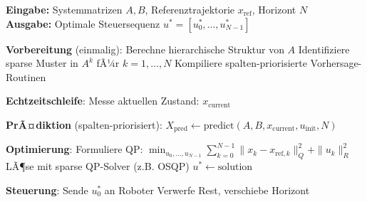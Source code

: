 ﻿\documentclass[a4paper,12pt]{report}
\theoremstyle{definition}
\begin{document}
	\begin{algorithm}[H]
		\caption{Strukturausnutzende MPC fÃ¼r Robotersteuerung}
		\label{alg:robot-mpc}
		\textbf{Eingabe:} Systemmatrizen $A, B$, Referenztrajektorie $x_{\text{ref}}$, Horizont $N$ \\
		\textbf{Ausgabe:} Optimale Steuersequenz $u^* = [u_0^*, \ldots, u_{N-1}^*]$
		\begin{algorithmic}[1]
			\State \textbf{Vorbereitung} (einmalig):
			\State Berechne hierarchische Struktur von $A$
			\State Identifiziere sparse Muster in $A^k$ fÃ¼r $k = 1, \ldots, N$
			\State Kompiliere spalten-priorisierte Vorhersage-Routinen
			
			\State \textbf{Echtzeitschleife}:
			\State Messe aktuellen Zustand: $x_{\text{current}}$
			
			\State \textbf{PrÃ¤diktion} (spalten-priorisiert):
			\State $X_{\text{pred}} \gets \text{predict}(A, B, x_{\text{current}}, u_{\text{init}}, N)$
			
			\State \textbf{Optimierung}:
			\State Formuliere QP: $\min_{u_0, \ldots, u_{N-1}} \sum_{k=0}^{N-1} \|x_k - x_{\text{ref},k}\|^2_Q + \|u_k\|^2_R$
			\State LÃ¶se mit sparse QP-Solver (z.B. OSQP)
			\State $u^* \gets \text{solution}$
			
			\State \textbf{Steuerung}:
			\State Sende $u_0^*$ an Roboter
			\State Verwerfe Rest, verschiebe Horizont
			\EndWhile
		\end{algorithmic}
	\end{algorithm}
	
\end{document}
